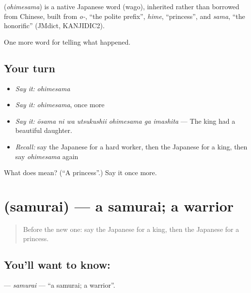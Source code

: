 \begin{cousinweb}
\textbf{} (\emph{ohimesama}) is a native Japanese word (wago), inherited rather than borrowed from Chinese, built from \emph{o-}, \textquotedblleft{}the polite prefix\textquotedblright{}, \emph{hime}, \textquotedblleft{}princess\textquotedblright{}, and \emph{sama}, \textquotedblleft{}the honorific\textquotedblright{} (JMdict, KANJIDIC2).
\end{cousinweb}

\begin{grammarlens}[title={What you've built}]
One more word for telling what happened.
\end{grammarlens}

\subsection*{Your turn}
\begin{itemize}
\raggedright
  \item \emph{Say it:} \emph{ohimesama}
  \item \emph{Say it:} \emph{ohimesama}, once more
  \item \emph{Say it:} \emph{ōsama ni wa utsukushii ohimesama ga imashita} — The king had a beautiful daughter.
  \item \emph{Recall:} say the Japanese for a hard worker, then the Japanese for a king, then say \emph{ohimesama} again
\end{itemize}

\begin{tcolorbox}[breakable,colback=teal!4,colframe=teal!35!black,title={Before you move on}]
What does  mean? (\textquotedblleft{}A princess\textquotedblright{}.) Say it once more.
\end{tcolorbox}
\section[\texorpdfstring{\ja{さむらい} (samurai)}{さむらい (samurai)}]{ (samurai) — a samurai; a warrior}

\label{lesson:JA-C299-samurai}



\begin{quote}
Before the new one: say the Japanese for a king, then the Japanese for a princess.
\end{quote}

\subsection*{You'll want to know: }
\textbf{} — \emph{samurai} — \textquotedblleft{}a samurai; a warrior\textquotedblright{}.

